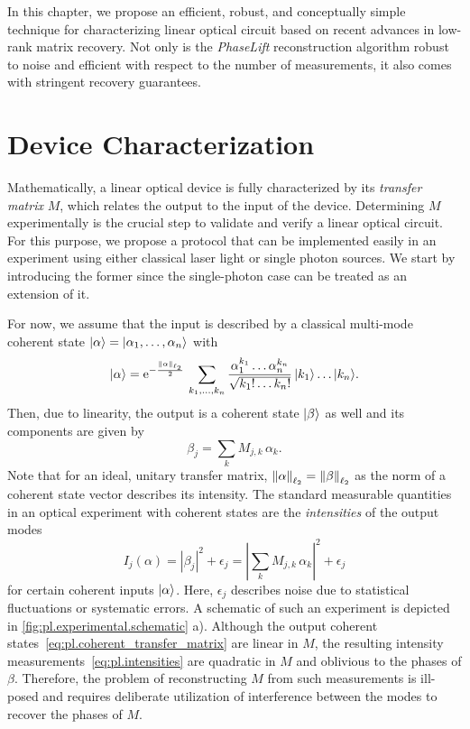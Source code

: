 In this chapter, we propose an efficient, robust, and conceptually simple technique for characterizing linear optical circuit based on recent advances in low-rank matrix recovery.
Not only is the \emph{PhaseLift} reconstruction algorithm robust to noise and efficient with respect to the number of measurements, it also comes with stringent recovery guarantees.

\section{Device Characterization}%
\label{sec:pl.optics}


Mathematically, a linear optical device is fully characterized by its \emph{transfer matrix} ${M}$, which relates the output to the input of the device.
Determining ${M}$ experimentally is the crucial step to validate and verify a linear optical circuit.
For this purpose, we propose a protocol that can be implemented easily in an experiment using either classical laser light or single photon sources.
We start by introducing the former since the single-photon case can be treated as an extension of it.

For now, we assume that the input is described by a classical multi-mode coherent state $\ket{{\alpha}} = \ket{\alpha_1, \ldots, \alpha_n}$ with
\[
  \ket{\alpha} = \mathrm{e}^{-\frac{\ltwonorm{\alpha}}{2}} \, \sum_{k_1,\ldots,k_n}  \frac{\alpha_1^{k_1} \ldots \alpha_n^{k_n}}{\sqrt{k_1! \ldots k_n!}} \, \ket{k_1} \ldots \ket{k_n}.
\]
Then, due to linearity, the output is a coherent state $\ket{\beta}$ as well and its components are given by
\[
  \beta_j = \sum_k M_{j,k} \,\alpha_k.
  \label{eq:pl.coherent_transfer_matrix}
\]
Note that for an ideal, unitary transfer matrix, ${\Vert\alpha\Vert}_{\ell_2} = {\Vert\beta\Vert}_{\ell_2}$ as the norm of a coherent state vector describes its intensity.
The standard measurable quantities in an optical experiment with coherent states are the \emph{intensities} of the output modes
\[
  I_j({\alpha})
  = \left| \beta_j \right|^2 + \epsilon_j
  = \left| \sum_k M_{j,k} \, \alpha_k \right|^2 + \epsilon_j
  \label{eq:pl.intensities}
\]
for certain coherent inputs $\ket{{\alpha}}$.
Here, $\epsilon_j$ describes noise due to statistical fluctuations or systematic errors.
A schematic of such an experiment is depicted in \cref{fig:pl.experimental.schematic} a).
Although the output coherent states~\eqref{eq:pl.coherent_transfer_matrix} are linear in ${M}$, the resulting intensity measurements~\eqref{eq:pl.intensities} are quadratic in ${M}$ and oblivious to the phases of $\beta$.
Therefore, the problem of reconstructing ${M}$ from such measurements is ill-posed and requires deliberate utilization of interference between the modes to recover the phases of $M$.

